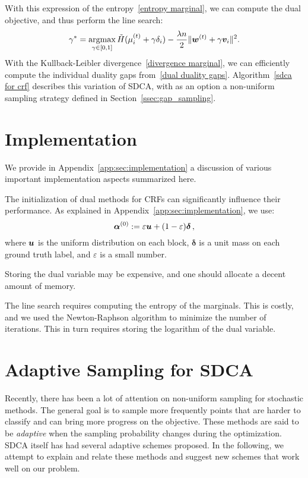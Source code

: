 With this expression of the entropy~\eqref{entropy marginal}, we can compute the dual objective, and thus perform the line search:
\begin{equation}\label{crf line search}
	\gamma^* = \operatorname*{argmax}_{\gamma \in [0,1]} \tilde H(\mu_i^{(t)} + \gamma \delta_i) - \frac{\lambda n}{2} \| \boldsymbol{w}^{(t)} + \gamma \bm v_i \|^2.
\end{equation}
With the Kullback-Leibler divergence~\eqref{divergence marginal}, we can efficiently compute the individual duality gaps from~\eqref{dual duality gaps}.
Algorithm~\ref{sdca for crf} describes this variation of SDCA, with as an option a non-uniform sampling strategy defined in  Section~\ref{ssec:gap_sampling}.

\section{Implementation} \label{sec:implementation}
We provide in Appendix~\ref{app:sec:implementation} a discussion of various important implementation aspects summarized here.
\begin{compactenum}
	\item The initialization of dual methods for CRFs can significantly influence their performance. As explained in Appendix~\ref{app:sec:implementation}, we use:
	\begin{equation} \label{eq:initialization}
		\boldsymbol{\alpha}^{(0)} := \varepsilon \bm u + (1-\varepsilon) \bm\delta \, ,
	\end{equation}
	where $\bm u$ is the uniform distribution on each block, $\bm\delta$ is a unit mass on each ground truth label, and $\varepsilon$ is a small number.
	\item Storing the dual variable may be expensive, and one should allocate a decent amount of memory.
	\item The line search requires computing the entropy of the marginals.
	This is costly, and we used the Newton-Raphson algorithm to minimize the number of iterations.
	This in turn requires storing the logarithm of the dual variable.
\end{compactenum}
\section{Adaptive Sampling for SDCA} \label{Adaptive Sampling}

Recently, there has been a lot of attention on non-uniform sampling for stochastic methods.
The general goal is to sample more frequently points that are harder to classify and can bring more progress on the objective.
These methods are said to be \textit{adaptive} when the sampling probability changes during the optimization.
SDCA itself has had several adaptive schemes proposed.
In the following, we attempt to explain and relate these methods and suggest new schemes that work well on our problem.

